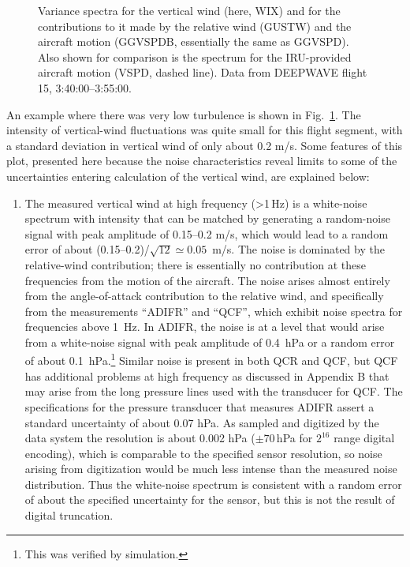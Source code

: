 \documentclass[12pt,twoside,english]{article}\usepackage[]{graphicx}\usepackage[]{color}
\let\OrgIndex\index
\renewcommand*{\index}[1]{\OrgIndex{#1}}
\begin{document}
{{\begin{figure}
\protect\caption[Variance spectra for the vertical wind and for the contributions made by the relative wind and the aircraft motion.]{\label{fig:WIXHR1}Variance spectra for the vertical wind (here, WIX) and for the contributions to it made by the relative wind (GUSTW) and the aircraft motion (GGVSPDB, essentially the same as GGVSPD). Also shown for comparison is the spectrum for the IRU-provided aircraft motion (VSPD, dashed line). Data from DEEPWAVE flight 15, 3:40:00--3:55:00.} 
\end{figure}

An example where there was very low turbulence is shown in Fig.~\ref{fig:WIXHR1}. The intensity of vertical-wind fluctuations was quite small for this flight segment, with a standard deviation in vertical wind of only about 0.2 m/s. Some features of this plot, presented here because the noise characteristics reveal limits to some of the uncertainties entering calculation of the vertical wind, are explained below:  
\begin{enumerate}
\item The measured vertical wind at high frequency (>1\,Hz) is a white-noise spectrum with intensity that can be matched by generating a random-noise signal with peak amplitude of 0.15--0.2 m/s, which would lead to a random error of about (0.15--0.2)/$\sqrt{12}\simeq0.05$~m/s. The noise is dominated by the relative-wind contribution; there is essentially no contribution at these frequencies from the motion of the aircraft. The noise arises almost entirely from the angle-of-attack contribution to the relative wind, and specifically from the measurements ``ADIFR'' and ``QCF'', which exhibit noise spectra for frequencies above 1~Hz. In ADIFR, the noise is at a level that would arise from a white-noise signal with peak amplitude of 0.4~hPa or a random error of about 0.1~hPa.\footnote{This was verified by simulation.} \label{page:ADIFRnoise}Similar noise is present in both QCR and QCF, but QCF has additional problems at high frequency as discussed in Appendix B that may arise from the long pressure lines used with the transducer for QCF. The specifications for the pressure transducer that measures ADIFR assert a standard uncertainty of about 0.07 hPa. As sampled and digitized by the data system the resolution is about 0.002 hPa ($\pm70\,$hPa for $2^{16}$ range digital encoding), which is comparable to the specified sensor resolution, so noise arising from digitization would be much less intense than the measured noise distribution. Thus the white-noise spectrum is consistent with a random error of about the specified uncertainty for the sensor, but this is not the result of digital truncation. 


\end{enumerate}}}
\end{document}
